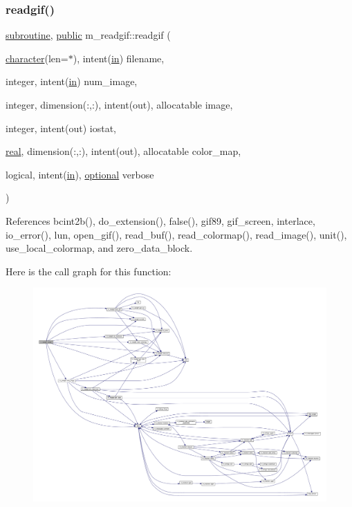 \subsubsection{\texorpdfstring{readgif()}{readgif()}}
{\footnotesize\ttfamily \hyperlink{M__stopwatch_83_8txt_acfbcff50169d691ff02d4a123ed70482}{subroutine}, \hyperlink{M__stopwatch_83_8txt_a2f74811300c361e53b430611a7d1769f}{public} m\+\_\+readgif\+::readgif (\begin{DoxyParamCaption}\item[{\hyperlink{option__stopwatch_83_8txt_abd4b21fbbd175834027b5224bfe97e66}{character}(len=$\ast$), intent(\hyperlink{M__journal_83_8txt_afce72651d1eed785a2132bee863b2f38}{in})}]{filename,  }\item[{integer, intent(\hyperlink{M__journal_83_8txt_afce72651d1eed785a2132bee863b2f38}{in})}]{num\+\_\+image,  }\item[{integer, dimension(\+:,\+:), intent(out), allocatable}]{image,  }\item[{integer, intent(out)}]{iostat,  }\item[{\hyperlink{read__watch_83_8txt_abdb62bde002f38ef75f810d3a905a823}{real}, dimension(\+:,\+:), intent(out), allocatable}]{color\+\_\+map,  }\item[{logical, intent(\hyperlink{M__journal_83_8txt_afce72651d1eed785a2132bee863b2f38}{in}), \hyperlink{option__stopwatch_83_8txt_aa4ece75e7acf58a4843f70fe18c3ade5}{optional}}]{verbose }\end{DoxyParamCaption})}



References bcint2b(), do\+\_\+extension(), false(), gif89, gif\+\_\+screen, interlace, io\+\_\+error(), lun, open\+\_\+gif(), read\+\_\+buf(), read\+\_\+colormap(), read\+\_\+image(), unit(), use\+\_\+local\+\_\+colormap, and zero\+\_\+data\+\_\+block.

Here is the call graph for this function\+:
\nopagebreak
\begin{figure}[H]
\begin{center}
\leavevmode
\includegraphics[width=350pt]{namespacem__readgif_a775e2da2a9f54ec308e87a339a393ed6_cgraph}
\end{center}
\end{figure}


